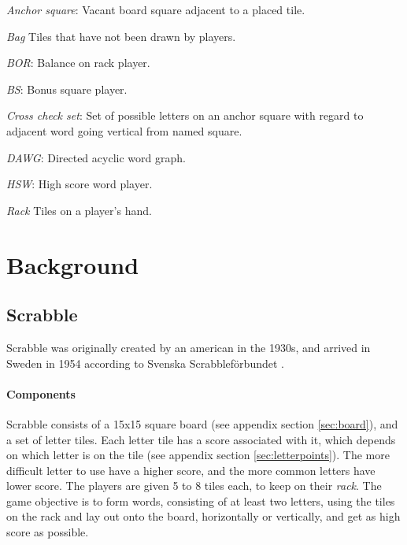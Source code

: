 \documentclass[a4paper, 12pt]{report}
\begin{document}
\begin{description}
\item{\emph{Anchor square}}: Vacant board square adjacent to a placed tile.

\item{\emph{Bag}} Tiles that have not been drawn by players.

\item{\emph{BOR}}: Balance on rack player.

\item{\emph{BS}}: Bonus square player.

\item{\emph{Cross check set}}: Set of possible letters on an anchor square with regard to adjacent word going vertical from named square.

\item{\emph{DAWG}}: Directed acyclic word graph.

\item{\emph{HSW}}: High score word player.

\item{\emph{Rack}} Tiles on a player's hand. 

\end{description}







\chapter{Background}

\section{Scrabble}
Scrabble was originally created by an american in the 1930s, and arrived in Sweden in 1954 according to Svenska Scrabbleförbundet \cite{forbund}. 

\subsubsection{Components}
Scrabble consists of a 15x15 square board (see appendix section \ref{sec:board}), and a set of letter tiles. Each letter tile has a score associated with it, which depends on which letter is on the tile (see appendix section \ref{sec:letterpoints}). The more difficult letter to use have a higher score, and the more common letters have lower score. The players are given 5 to 8 tiles each, to keep on their \emph{rack}. The game objective is to form words, consisting of at least two letters, using the tiles on the rack and lay out onto the board, horizontally or vertically, and get as high score as possible. 
\end{document}
